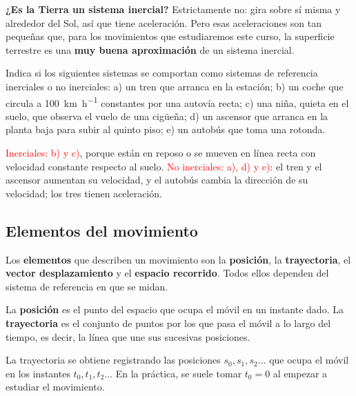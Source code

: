 \begin{remark}
    \textbf{¿Es la Tierra un sistema inercial?} Estrictamente no: gira sobre sí misma y alrededor del Sol, así que tiene
    aceleración. Pero esas aceleraciones son tan pequeñas que, para los movimientos que estudiaremos este curso, la superficie
    terrestre es una \textbf{muy buena aproximación} de un sistema inercial.
\end{remark}

\begin{exercise}
    Indica si los siguientes sistemas se comportan como sistemas de referencia inerciales o no inerciales: a) un tren que arranca
    en la estación; b) un coche que circula a \qty{100}{\km\per\hour} constantes por una autovía recta; c) una niña, quieta en el
    suelo, que observa el vuelo de una cigüeña; d) un ascensor que arranca en la planta baja para subir al quinto piso; e) un
    autobús que toma una rotonda.
    \begin{solu}
        \textcolor{red}{Inerciales: b) y c)}, porque están en reposo o se mueven en línea recta con velocidad constante respecto
        al suelo. \textcolor{red}{No inerciales: a), d) y e)}: el tren y el ascensor aumentan su velocidad, y el autobús cambia la
        dirección de su velocidad; los tres tienen aceleración.
    \end{solu}
\end{exercise}

\subsection{Elementos del movimiento}

Los \textbf{elementos} que describen un movimiento son la \textbf{posición}, la \textbf{trayectoria}, el \textbf{vector
desplazamiento} y el \textbf{espacio recorrido}. Todos ellos dependen del sistema de referencia en que se midan.

\begin{definition}
    La \textbf{posición} es el punto del espacio que ocupa el móvil en un instante dado. La \textbf{trayectoria} es el conjunto
    de puntos por los que pasa el móvil a lo largo del tiempo, es decir, la línea que une sus sucesivas posiciones.
\end{definition}

La trayectoria se obtiene registrando las posiciones \(s_0, s_1, s_2\ldots\) que ocupa el móvil en los instantes
\(t_0, t_1, t_2\ldots\) En la práctica, se suele tomar \(t_0 = 0\) al empezar a estudiar el movimiento.

